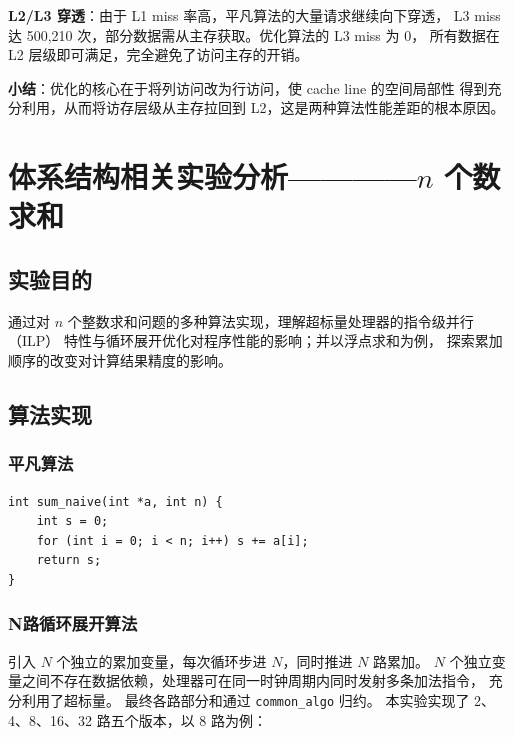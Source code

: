 \documentclass[a4paper]{article}
\begin{document}
\textbf{L2/L3 穿透}：由于 L1 miss 率高，平凡算法的大量请求继续向下穿透，
L3 miss 达 500,210 次，部分数据需从主存获取。优化算法的 L3 miss 为 0，
所有数据在 L2 层级即可满足，完全避免了访问主存的开销。

\textbf{小结}：优化的核心在于将列访问改为行访问，使 cache line 的空间局部性
得到充分利用，从而将访存层级从主存拉回到 L2，这是两种算法性能差距的根本原因。


\section{体系结构相关实验分析————$n$ 个数求和}

\subsection{实验目的}

通过对 $n$ 个整数求和问题的多种算法实现，理解超标量处理器的指令级并行（ILP）
特性与循环展开优化对程序性能的影响；并以浮点求和为例，
探索累加顺序的改变对计算结果精度的影响。

\subsection{算法实现}

\subsubsection{平凡算法}

\begin{verbatim}
int sum_naive(int *a, int n) {
    int s = 0;
    for (int i = 0; i < n; i++) s += a[i];
    return s;
}
\end{verbatim}

\subsubsection{N路循环展开算法}

引入 $N$ 个独立的累加变量，每次循环步进 $N$，同时推进 $N$ 路累加。
$N$ 个独立变量之间不存在数据依赖，处理器可在同一时钟周期内同时发射多条加法指令，
充分利用了超标量。
最终各路部分和通过 \texttt{common\_algo} 归约。
本实验实现了 2、4、8、16、32 路五个版本，以 8 路为例：
\end{document}
